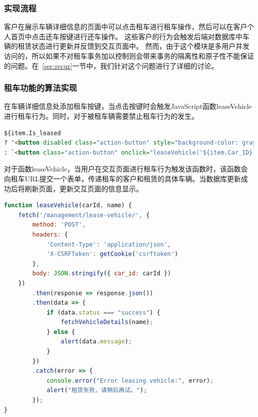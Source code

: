 \documentclass[UTF8,a4paper,12pt]{ctexart}
\begin{document}
\subsubsection{实现流程}
客户在展示车辆详细信息的页面中可以点击租车进行租车操作，然后可以在客户个人首页中点击还车按键进行还车操作。
这些客户的行为会触发后端对数据库中车辆的租赁状态进行更新并反馈到交互页面中。
然而，由于这个模块是多用户并发访问的，所以如果不对租车事务加以控制则会带来事务的隔离性和原子性不能保证的问题。在~\ref{sec:recur}一节中，我们针对这个问题进行了详细的讨论。

\subsubsection{租车功能的算法实现}
在车辆详细信息处添加租车按键，当点击按键时会触发JavaScript函数leaseVehicle进行租车行为。同时，对于被租车辆需要禁止租车行为的发生。
\begin{lstlisting}[language=HTML]
${item.Is_leased
? '<button disabled class="action-button" style="background-color: gray; cursor: not-allowed;">已租赁</button>'
: `<button class="action-button" onclick="leaseVehicle('${item.Car_ID}', '${name}')">租赁</button>`}
\end{lstlisting}

对于函数leaseVehicle，当用户在交互页面进行租车行为触发该函数时，该函数会向租车URL提交一个表单，传递租车的客户和租赁的具体车辆。当数据库更新成功后将刷新页面，更新交互页面的信息显示。
\begin{lstlisting}[language=JavaScript]
function leaseVehicle(carId, name) {
    fetch('/management/lease-vehicle/', {
        method: 'POST',
        headers: {
            'Content-Type': 'application/json',
            'X-CSRFToken': getCookie('csrftoken') 
        },
        body: JSON.stringify({ car_id: carId })  
    })
        .then(response => response.json())
        .then(data => {
            if (data.status === "success") {
                fetchVehicleDetails(name); 
            } else {
                alert(data.message); 
            }
        })
        .catch(error => {
            console.error("Error leasing vehicle:", error);
            alert("租赁失败，请稍后再试。");
        });
}
\end{lstlisting}
\end{document}
